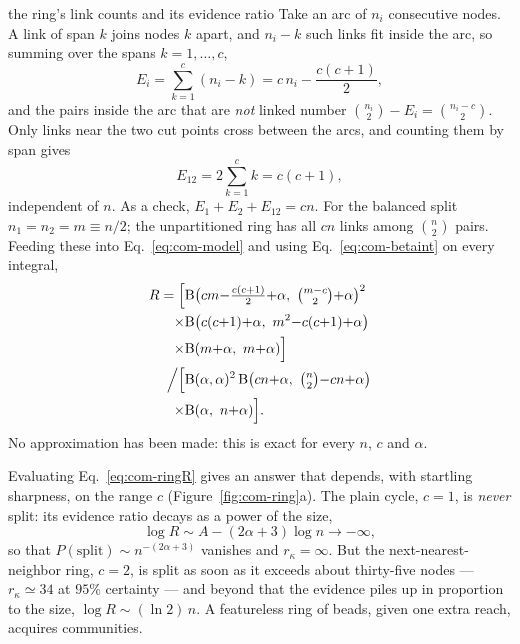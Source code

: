 \begin{calculation}{the ring's link counts and its evidence ratio}
Take an arc of $n_i$ consecutive nodes. A link of span $k$ joins nodes $k$ apart,
and $n_i-k$ such links fit inside the arc, so summing over the spans
$k=1,\dots,c$,
\begin{equation}
  E_i = \sum_{k=1}^{c}(n_i-k) = c\,n_i - \frac{c(c+1)}{2},
  \label{eq:com-ringEi}
\end{equation}
and the pairs inside the arc that are \emph{not} linked number
$\binom{n_i}{2}-E_i=\binom{n_i-c}{2}$. Only links near the two cut points cross
between the arcs, and counting them by span gives
\begin{equation}
  E_{12} = 2\sum_{k=1}^{c} k = c(c+1),
  \label{eq:com-ringE12}
\end{equation}
independent of $n$. As a check, $E_1+E_2+E_{12}=cn$. For the balanced split
$n_1=n_2=m\equiv n/2$; the unpartitioned ring has all $cn$ links among
$\binom{n}{2}$ pairs. Feeding these into Eq.~\eqref{eq:com-model} and using
Eq.~\eqref{eq:com-betaint} on every integral,
\begin{equation}
\begin{split}
  R = \Big[ &\mathrm{B}\big(cm{-}\tfrac{c(c+1)}{2}{+}\alpha,\ \tbinom{m-c}{2}{+}\alpha\big)^{2}\\
  \times{} &\mathrm{B}\big(c(c{+}1){+}\alpha,\ m^{2}{-}c(c{+}1){+}\alpha\big)\\
  \times{} &\mathrm{B}(m{+}\alpha,\ m{+}\alpha) \Big]\\
  \Big/ \Big[ &\mathrm{B}(\alpha,\alpha)^{2}\,
  \mathrm{B}\big(cn{+}\alpha,\ \tbinom{n}{2}{-}cn{+}\alpha\big)\\
  \times{} &\mathrm{B}(\alpha,\ n{+}\alpha) \Big].
\end{split}
\label{eq:com-ringR}
\end{equation}
No approximation has been made: this is exact for every $n$, $c$ and $\alpha$.
\end{calculation}

Evaluating Eq.~\eqref{eq:com-ringR} gives an answer that depends, with startling
sharpness, on the range $c$ (Figure~\ref{fig:com-ring}a). The plain cycle, $c=1$,
is \emph{never} split: its evidence ratio decays as a power of the size,
\begin{equation}
  \log R \sim A - (2\alpha+3)\log n \longrightarrow -\infty,
  \label{eq:com-ringc1}
\end{equation}
so that $P(\mathrm{split})\sim n^{-(2\alpha+3)}$ vanishes and $r_\kappa=\infty$.
But the next-nearest-neighbor ring, $c=2$, is split as soon as it exceeds about
thirty-five nodes --- $r_\kappa\simeq34$ at $95\%$ certainty --- and beyond that
the evidence piles up in proportion to the size, $\log R\sim(\ln 2)\,n$. A
featureless ring of beads, given one extra reach, acquires communities.

